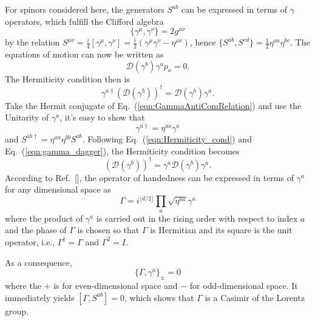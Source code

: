\documentclass[%
 reprint,
groupedaddress,
showpacs,
 amsmath,amssymb,
 aps,
prb,
]{revtex4-1}
\begin{document}
For spinors considered here, the generators $ S^{ab} $ can be expressed in  terms of $ \gamma $ operators, which fulfill the Clifford algebra
\begin{equation}
\label{eqn:GammaAntiComRelation}
\{ \gamma^{\mu}, \gamma^{\nu} \} = 2 g^{\mu \nu}
\end{equation}
by the relation $ S^{\mu \nu} = \frac{i}{4} [ \gamma^{\mu}, \gamma^{\nu} ]  = \frac{i}{2}( \gamma^\mu \gamma^\nu - \eta^{\mu \nu} ) $, hence $ \{ S^{ab},S^{cd} \}= \frac{1}{2} \eta^{aa} \eta^{bc} $. The equations of motion can now be written as
\begin{equation}
\label{eqn:EOM_with_D}
\mathcal{D}(\gamma^b)\gamma^a p_a = 0.
\end{equation}
The Hermiticity condition then is
\begin{equation}
\label{eqn:Hermiticity_cond}
\gamma^{a\dagger}(\mathcal D (\gamma^b))^{\dagger} = \mathcal D (\gamma^b) \gamma^a.
\end{equation}
Take the Hermit conjugate of Eq.~(\ref{eqn:GammaAntiComRelation}) and use the Unitarity of $\gamma^a $, it's easy to show that
\begin{equation}
\label{eqn:gamma_dagger}
\gamma^{a\dagger} = \eta^{aa} \gamma^a
\end{equation}
and $ S^{ab\dagger} = \eta^{aa} \eta^{bb} S^{ab} $. Following Eq.~(\ref{eqn:Hermiticity_cond}) and Eq.~(\ref{eqn:gamma_dagger}), the Hermiticity condition becomes
\begin{equation}
\label{eqn:Hermiticity_cond_2}
(\mathcal D (\gamma^b))^{\dagger} = \gamma^a \mathcal D (\gamma^b) \gamma^a.
\end{equation}
According to Ref.~[], the operator of handedness can be expressed in terms of $ \gamma^a $ for any dimensional space as
\begin{equation}
\label{eqn:handednessOperator}
\Gamma = i^{\lfloor d/2\rfloor} \prod_a \sqrt{\eta^{aa}}\gamma^a
\end{equation}
where the product of $ \gamma^a $ is carried out in the rising order with respect to index $a$ and the phase of $\Gamma $ is chosen so that $\Gamma $ is Hermitian and its square is the unit operator, i.e., $ \Gamma^{\dagger} = \Gamma $ and $ \Gamma^2 = I $.

As a consequence,
\begin{equation}
\label{eqn:Gamma_gamma}
\{ \Gamma, \gamma^a \}_{\pm} = 0
\end{equation}
where the $+$ is for even-dimensional space and $-$ for odd-dimensional space. It immediately yields $ [\Gamma, S^{ab}] = 0 $, which shows that $\Gamma $ is a Casimir of the Lorentz group.
\end{document}
